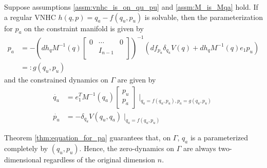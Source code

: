 \begin{thm}\label{thm:equation_for_pa}
Suppose assumptions \ref{assm:vnhc_is_on_qu_pu} and \ref{assm:M_is_Mqa} hold. If a regular VNHC \(h(q,p) = q_a - f(q_u,p_u)\) is solvable, then the parameterization for \(p_a\) on the constraint manifold is given by
\begin{align*}
p_a &= -\left(dh_q M^{-1}(q) \begin{bmatrix}
    0 & \cdots & 0 \\
    & I_{n-1} & \\
    \end{bmatrix}\right)^{-1}\left( df_{p_u}\delta_{q_u}V(q) + dh_q M^{-1}(q)e_1 p_u\right) \\
    &=: g(q_u,p_u)
\end{align*}
and the constrained dynamics on \(\Gamma\) are given by
\begin{align*}
    \dot{q_u} &= e_1^T M^{-1}(q_a) \begin{bmatrix}
    p_u \\
    p_a
    \end{bmatrix}\mid_{q_a = f(q_u,p_u), p_a = g(q_u,p_u)} \\
    \dot{p_u} &= -\delta_{q_u} V(q_u,q_a) \mid_{q_a = f(q_u,p_u)}
\end{align*}
\end{thm}

Theorem \ref{thm:equation_for_pa} guarantees that, on \(\Gamma\), \(q_a\) is a parameterized completely by \((q_u,p_u)\). Hence, the zero-dynamics on \(\Gamma\) are always two-dimensional regardless of the original dimension \(n\).
